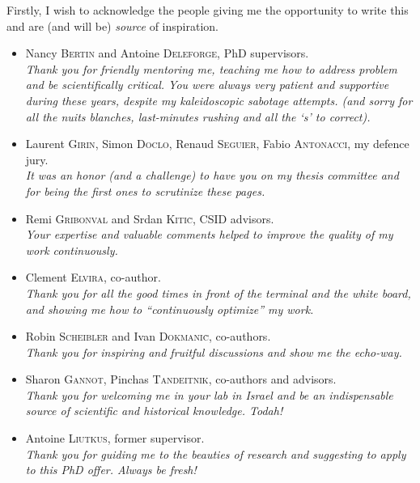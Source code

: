 \mynewline
Firstly, I wish to acknowledge the people giving me the opportunity to write this and are (and will be) \textit{source} of inspiration.
\begin{itemize}
    \item Nancy \textsc{Bertin} and Antoine \textsc{Deleforge}, PhD supervisors.
    \\\textit{Thank you for friendly mentoring me, teaching me how to address problem and be scientifically critical.
    You were always very patient and supportive during these years, despite my kaleidoscopic sabotage attempts.
    (and sorry for all the \emph{nuits blanches}, last-minutes rushing and all the `s' to correct).}

    \item Laurent \textsc{Girin}, Simon \textsc{Doclo}, Renaud \textsc{Seguier}, Fabio \textsc{Antonacci}, my defence jury.
    \\\textit{It was an honor (and a challenge) to have you on my thesis committee and for being the first ones to scrutinize these pages.}

    \item Remi \textsc{Gribonval} and Srdan \textsc{Kiti\`c}, CSID advisors.
    \\\textit{Your expertise and valuable comments helped to improve the quality of my work continuously.}

    \item Clement \textsc{Elvira}, co-author.
    \\\textit{Thank you for all the good times in front of the terminal and the white board, and showing me how to ``continuously optimize'' my work.}

    \item Robin \textsc{Scheibler} and Ivan \textsc{Dokmani\`c}, co-authors.
    \\\textit{Thank you for inspiring and fruitful discussions and show me the echo-way.}

    \item Sharon \textsc{Gannot}, Pinchas \textsc{Tandeitnik}, co-authors and advisors.
    \\\textit{Thank you for welcoming me in your lab in Israel and be an indispensable source of scientific and historical knowledge. Todah!}

    \item Antoine \textsc{Liutkus}, former supervisor.
    \\\textit{Thank you for guiding me to the beauties of research and suggesting to apply to this PhD offer. Always be fresh!}
\end{itemize}

